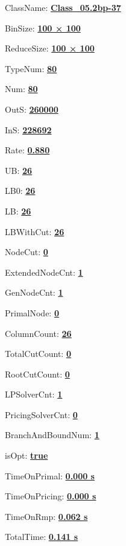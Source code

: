 \documentclass[11pt]{article}
\begin{document}
\pagestyle{empty}


ClassName: \underline{\textbf{Class_05.2bp-37}}
\par
BinSize: \underline{\textbf{100 × 100}}
\par
ReduceSize: \underline{\textbf{100 × 100}}
\par
TypeNum: \underline{\textbf{80}}
\par
Num: \underline{\textbf{80}}
\par
OutS: \underline{\textbf{260000}}
\par
InS: \underline{\textbf{228692}}
\par
Rate: \underline{\textbf{0.880}}
\par
UB: \underline{\textbf{26}}
\par
LB0: \underline{\textbf{26}}
\par
LB: \underline{\textbf{26}}
\par
LBWithCut: \underline{\textbf{26}}
\par
NodeCut: \underline{\textbf{0}}
\par
ExtendedNodeCnt: \underline{\textbf{1}}
\par
GenNodeCnt: \underline{\textbf{1}}
\par
PrimalNode: \underline{\textbf{0}}
\par
ColumnCount: \underline{\textbf{26}}
\par
TotalCutCount: \underline{\textbf{0}}
\par
RootCutCount: \underline{\textbf{0}}
\par
LPSolverCnt: \underline{\textbf{1}}
\par
PricingSolverCnt: \underline{\textbf{0}}
\par
BranchAndBoundNum: \underline{\textbf{1}}
\par
isOpt: \underline{\textbf{true}}
\par
TimeOnPrimal: \underline{\textbf{0.000 s}}
\par
TimeOnPricing: \underline{\textbf{0.000 s}}
\par
TimeOnRmp: \underline{\textbf{0.062 s}}
\par
TotalTime: \underline{\textbf{0.141 s}}
\par
\newpage


\end{document}
